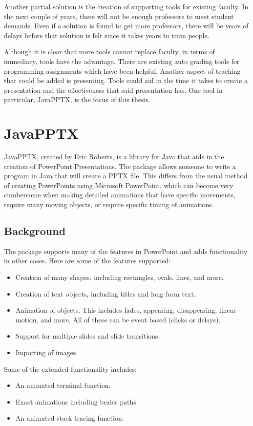 \documentclass[12pt,twoside]{reedthesis}
\begin{document}
Another partial solution is the creation of supporting tools for existing faculty. In the next couple of years, there will not be enough professors to meet student demands. Even if a solution is found to get more professors, there will be years of delays before that solution is felt since it takes years to train people. 

Although it is clear that more tools cannot replace faculty, in terms of immediacy, tools have the advantage. There are existing auto grading tools for programming assignments which have been helpful. Another aspect of teaching that could be added is presenting. Tools could aid in the time it takes to create a presentation and the effectiveness that said presentation has. One tool in particular, JavaPPTX, is the focus of this thesis.


\section{JavaPPTX}
JavaPPTX, created by Eric Roberts, is a library for Java that aids in the creation of PowerPoint Presentations. The package allows someone to write a program in Java that will create a PPTX file. This differs from the usual method of creating PowerPoints using Microsoft PowerPoint, which can become very cumbersome when making detailed animations that have specific movements, require many moving objects, or require specific timing of animations.

\subsection{Background}
The package supports many of the features in PowerPoint and adds functionality in other cases. Here are some of the features supported:
\begin{itemize}
\item Creation of many shapes, including rectangles, ovals, lines, and more. 
\item Creation of text objects, including titles and long form text. 
\item Animation of objects. This includes fades, appearing, disappearing, linear motion, and more. All of these can be event based (clicks or delays). 
\item Support for multiple slides and slide transitions.
\item Importing of images.
\end{itemize}
Some of the extended functionality includes:
\begin{itemize}
\item An animated terminal function.
\item Exact animations including bezier paths. 
\item An animated stack tracing function.
\end{itemize}
\end{document}
